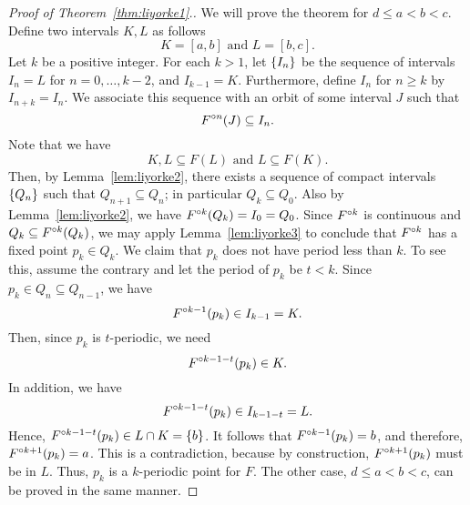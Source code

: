 \documentclass[12pt,draft,twoside]{book}
\begin{document}
\begin{proof}[Proof of Theorem~\ref{thm:liyorke1}.]
  We will prove the theorem for $d \leq a < b < c$.
  Define two intervals $K,L$ as follows
  \begin{equation*}
    K = [a,b] \mbox{ and } L = [b,c].
  \end{equation*}
  Let $k$ be a positive integer.
  For each $k > 1$, let $\left \{ I_n \right \}$ be the sequence of intervals $I_n = L$ for $n = 0, \ldots, k-2$, and $I_{k-1} = K$.
  Furthermore, define $I_n$ for $n \geq k$ by $I_{n+k} = I_n$.
  We associate this sequence with an orbit of some interval $J$ such that
  \begin{equation*}
    F^{\circ n}(J) \subseteq I_n.
  \end{equation*}
  Note that we have 
  \begin{equation*}
    K,L \subseteq F(L) \mbox{ and } L \subseteq F(K).
  \end{equation*}
  Then, by Lemma~\ref{lem:liyorke2}, there exists a sequence of compact intervals $\left \{ Q_n \right \}$ such that $Q_{n+1} \subseteq Q_{n}$; in particular $Q_k \subseteq Q_0$.
  Also by Lemma~\ref{lem:liyorke2}, we have $F^{\circ k}(Q_k) = I_0 = Q_0$.
  Since $F^{\circ k}$ is continuous and $Q_k \subseteq F^{\circ k}(Q_k)$, we may apply Lemma~\ref{lem:liyorke3} to conclude that $F^{\circ k}$ has a fixed point $p_k \in Q_k$.
  We claim that $p_k$ does not have period less than $k$.
  To see this, assume the contrary and let the period of $p_k$ be $t < k$.
  Since $p_k \in Q_n \subseteq Q_{n-1}$, we have 
  \begin{equation*}
    F^{\circ k-1}(p_k) \in I_{k-1} = K.
  \end{equation*}
  Then, since $p_k$ is $t$-periodic, we need 
  \begin{equation*}
    F^{\circ k-1-t}(p_k) \in K.
  \end{equation*}
  In addition, we have
  \begin{equation*}
    F^{\circ k-1-t}(p_k) \in I_{k-1-t} = L.
  \end{equation*}
  Hence, $F^{\circ k-1-t}(p_k) \in L \cap K = \left \{ b \right \}$.
  It follows that $F^{\circ k-1}(p_k) = b$, and therefore, $F^{\circ k+1}(p_k) = a$.
  This is a contradiction, because by construction, $F^{\circ k+1}(p_k)$ must be in $L$.
  Thus, $p_k$ is a $k$-periodic point for $F$.
  The other case, $d \leq a < b < c$, can be proved in the same manner.
\end{proof}
\end{document}
